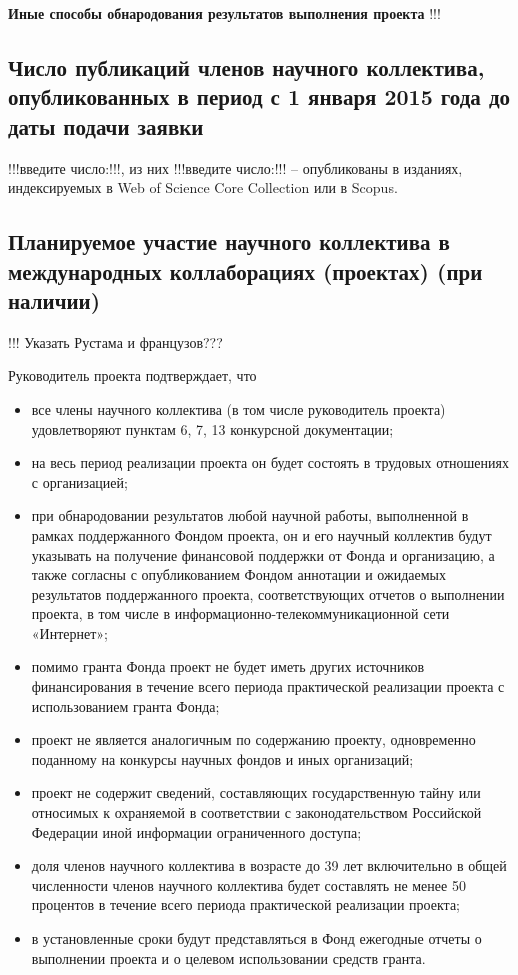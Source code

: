\documentclass[12pt]{article}  %
\theoremstyle{remark}
\begin{document}
\textbf{Иные способы обнародования результатов выполнения проекта}
!!!

\subsection{Число публикаций членов научного коллектива, опубликованных в период с 1 января 2015 года до даты подачи заявки}

!!!введите число:!!!, из них !!!введите число:!!! – опубликованы в изданиях, индексируемых в Web of Science Core Collection или в Scopus.

\subsection{Планируемое участие научного коллектива в международных коллаборациях (проектах) (при наличии)}
!!! Указать Рустама и французов???

\vline
Руководитель проекта подтверждает, что
\begin{itemize}
\item все члены научного коллектива (в том числе руководитель проекта) удовлетворяют пунктам 6, 7, 13 конкурсной документации;
\item на весь период реализации проекта он будет состоять в трудовых отношениях с организацией;
\item при обнародовании результатов любой научной работы, выполненной в рамках поддержанного Фондом проекта, он и его научный коллектив будут указывать на получение финансовой поддержки от Фонда и организацию, а также согласны с опубликованием Фондом аннотации и ожидаемых результатов поддержанного проекта, соответствующих отчетов о выполнении проекта, в том числе в информационно-телекоммуникационной сети «Интернет»;
\item помимо гранта Фонда проект не будет иметь других источников финансирования в течение всего периода практической реализации проекта с использованием гранта Фонда;
\item проект не является аналогичным по содержанию проекту, одновременно поданному на конкурсы научных фондов и иных организаций;
\item проект не содержит сведений, составляющих государственную тайну или относимых к охраняемой в соответствии с законодательством Российской Федерации иной информации ограниченного доступа;
\item доля членов научного коллектива в возрасте до 39 лет включительно в общей численности членов научного коллектива будет составлять не менее 50 процентов в течение всего периода практической реализации проекта;
\item в установленные сроки будут представляться в Фонд ежегодные отчеты о выполнении проекта и о целевом использовании средств гранта.
\end{itemize}
\end{document}
